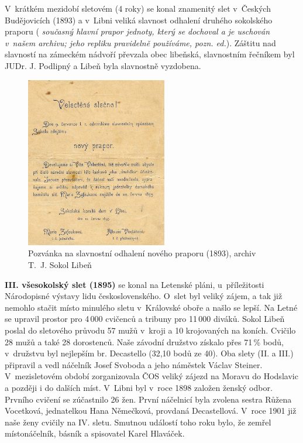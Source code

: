 \documentclass[a5paper, 11pt, twoside]{article}
\newcommand{\pozned}[1]{%
\textit{#1}}
\begin{document}
V~krátkém mezidobí sletovém (4 roky) se konal znamenitý slet v~Českých Budějovicích (1893) a v~Libni veliká slavnost odhalení druhého sokolského praporu (\pozned{současný hlavní prapor jednoty, který se dochoval a je uschován v~našem archivu; jeho repliku pravidelně používáme, pozn. ed.}). Záštitu nad slavností na zámeckém nádvoří převzala obec libeňská, slavnostním řečníkem byl JUDr. J. Podlipný a Libeň byla slavnostně vyzdobena.

\begin{figure}[h!]
  \centering
  \includegraphics[width=0.55\textwidth]{img/10_pozvanka_prapor.jpg}
  \caption*{Pozvánka na slavnostní odhalení nového praporu (1893), archiv T.~J. Sokol Libeň}
\end{figure}

\textbf{III. všesokolský slet (1895)} se konal na Letenské pláni, u~příležitosti Národopisné výstavy lidu československého. O~slet byl veliký zájem, a tak již nemohlo stačit místo minulého sletu v~Královské oboře a našlo se lepší. Na Letné se upravil prostor pro 4\,000 cvičenců a tribuny pro 11\,000 diváků. Sokol Libeň poslal do sletového průvodu 57 mužů v~kroji a 10 krojovaných na koních. Cvičilo 28 mužů a také 28 dorostenců. Naše závodní družstvo získalo přes 71\,\% bodů, v~družstvu byl nejlepším br. Decastello (32,10 bodů ze 40). Oba slety (II. a III.) připravil a vedl náčelník Josef Svoboda a jeho náměstek Václav Steiner. V~mezisletovém období zorganizovala ČOS veliký zájezd na Moravu do Hodslavic a později i do dalších míst. V~Libni byl v~roce 1898 založen ženský odbor. Prvního cvičení se zúčastnilo 26 žen. První náčelnicí byla zvolena sestra Růžena Vocetková, jednatelkou Hana Němečková, provdaná Decastellová. V~roce 1901 již naše ženy cvičily na IV. sletu. Smutnou událostí toho roku bylo, že zemřel místonáčelník, básník a spisovatel Karel Hlaváček.
\end{document}
